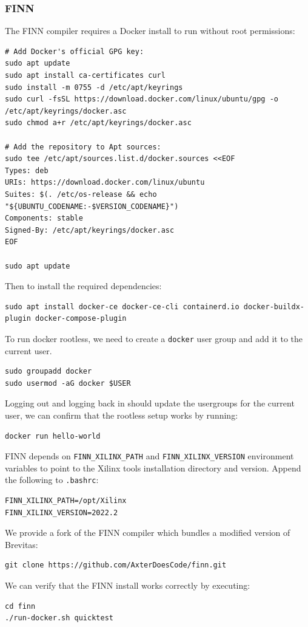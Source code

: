\documentclass[11pt]{article}
\begin{document}
\subsubsection{FINN}
The FINN compiler requires a Docker install to run without root permissions:
\begin{verbatim}
# Add Docker's official GPG key:
sudo apt update
sudo apt install ca-certificates curl
sudo install -m 0755 -d /etc/apt/keyrings
sudo curl -fsSL https://download.docker.com/linux/ubuntu/gpg -o /etc/apt/keyrings/docker.asc
sudo chmod a+r /etc/apt/keyrings/docker.asc

# Add the repository to Apt sources:
sudo tee /etc/apt/sources.list.d/docker.sources <<EOF
Types: deb
URIs: https://download.docker.com/linux/ubuntu
Suites: $(. /etc/os-release && echo "${UBUNTU_CODENAME:-$VERSION_CODENAME}")
Components: stable
Signed-By: /etc/apt/keyrings/docker.asc
EOF

sudo apt update
\end{verbatim}
Then to install the required dependencies:
\begin{verbatim}
sudo apt install docker-ce docker-ce-cli containerd.io docker-buildx-plugin docker-compose-plugin
\end{verbatim}
To run docker rootless, we need to create a \verb+docker+ user group and add it to the current user.
\begin{verbatim}
sudo groupadd docker
sudo usermod -aG docker $USER
\end{verbatim}
Logging out and logging back in should update the usergroups for the current user, we can confirm that the rootless setup works by running:
\begin{verbatim}
docker run hello-world
\end{verbatim}
FINN depends on \verb+FINN_XILINX_PATH+ and \verb+FINN_XILINX_VERSION+ environment variables to point to the Xilinx tools installation directory and version.
Append the following to \verb+.bashrc+:
\begin{verbatim}
FINN_XILINX_PATH=/opt/Xilinx
FINN_XILINX_VERSION=2022.2
\end{verbatim}
We provide a fork of the FINN compiler which bundles a modified version of Brevitas:
\begin{verbatim}
git clone https://github.com/AxterDoesCode/finn.git
\end{verbatim}
We can verify that the FINN install works correctly by executing:
\begin{verbatim}
cd finn
./run-docker.sh quicktest
\end{verbatim}
\end{document}
